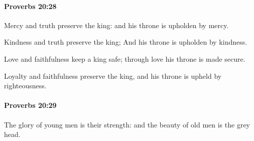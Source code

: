 		\paragraph{Proverbs 20:28} %
			\label{PROVERBS-20-28}

			Mercy and truth preserve the king: and his throne is upholden by mercy.

			\begin{versebox}
					\item[BHS] 
					\item[ASV] Kindness and truth preserve the king; And his throne is upholden by kindness.
					\item[NIV] Love and faithfulness keep a king safe; through love his throne is made secure.
					\item[NRSV] Loyalty and faithfulness preserve the king, and his throne is upheld by righteousness.
			\end{versebox}

		\paragraph{Proverbs 20:29} %
			\label{PROVERBS-20-29}

			The glory of young men is their strength: and the beauty of old men is the grey head.

